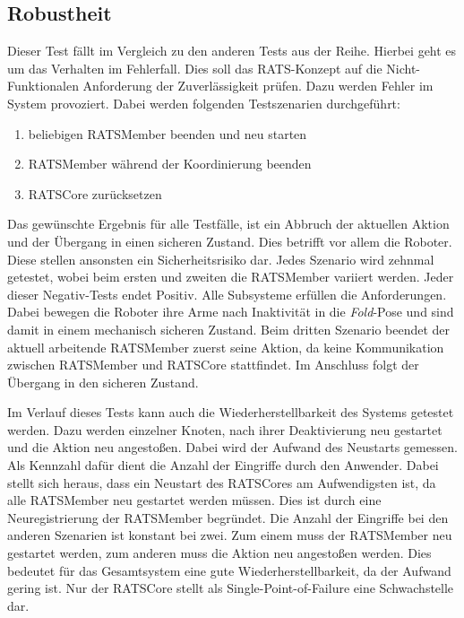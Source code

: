 \subsection{Robustheit}
Dieser Test fällt im Vergleich zu den anderen Tests aus der Reihe. Hierbei geht es um das Verhalten im Fehlerfall. Dies soll das RATS-Konzept auf die Nicht-Funktionalen Anforderung der Zuverlässigkeit prüfen. Dazu werden Fehler im System provoziert. Dabei werden folgenden Testszenarien durchgeführt:

\begin{enumerate}
	\item beliebigen RATSMember beenden und neu starten
	\item RATSMember während der Koordinierung beenden
	\item RATSCore zurücksetzen
\end{enumerate}

Das gewünschte Ergebnis für alle Testfälle, ist ein Abbruch der aktuellen Aktion und der Übergang in einen sicheren Zustand. Dies betrifft vor allem die Roboter. Diese stellen ansonsten ein Sicherheitsrisiko dar. Jedes Szenario wird zehnmal getestet, wobei beim ersten und zweiten die RATSMember variiert werden. Jeder dieser Negativ-Tests endet Positiv. Alle Subsysteme erfüllen die Anforderungen. Dabei bewegen die Roboter ihre Arme nach Inaktivität in die \textit{Fold}-Pose und sind damit in einem mechanisch sicheren Zustand. Beim dritten Szenario beendet der aktuell arbeitende RATSMember zuerst seine Aktion, da keine Kommunikation zwischen RATSMember und RATSCore stattfindet. Im Anschluss folgt der Übergang in den sicheren Zustand.

Im Verlauf dieses Tests kann auch die Wiederherstellbarkeit des Systems getestet werden. Dazu werden einzelner Knoten, nach ihrer Deaktivierung neu gestartet und die Aktion neu angestoßen. Dabei wird der Aufwand des Neustarts gemessen. Als Kennzahl dafür dient die Anzahl der Eingriffe durch den Anwender. Dabei stellt sich heraus, dass ein Neustart des RATSCores am Aufwendigsten ist, da alle RATSMember neu gestartet werden müssen. Dies ist durch eine Neuregistrierung der RATSMember begründet. Die Anzahl der Eingriffe bei den anderen Szenarien ist konstant bei zwei. Zum einem muss der RATSMember neu gestartet werden, zum anderen muss die Aktion neu angestoßen werden. Dies bedeutet für das Gesamtsystem eine gute Wiederherstellbarkeit, da der Aufwand gering ist. Nur der RATSCore stellt als Single-Point-of-Failure eine Schwachstelle dar.

